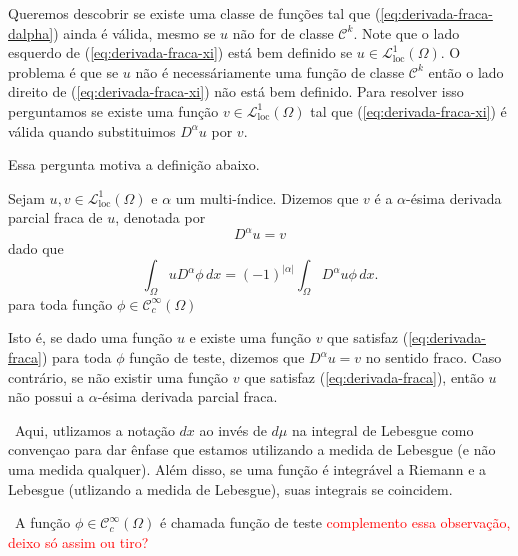 \documentclass[a4paper, 11pt]{book}
\theoremstyle{definition}
\newcommand{\obs}{\noindent{\textbf{\textcolor{black}{\sffamily Observação:}}}~}
\newcommand{\cC}{\mathcal{C}}
\newcommand{\cL}{\mathcal{L}}
\begin{document}
Queremos descobrir se existe uma classe de funções tal que (\ref{eq:derivada-fraca-dalpha}) ainda é válida, mesmo se $u$ não for de classe $\cC ^k$. Note que o lado esquerdo de (\ref{eq:derivada-fraca-xi}) está bem definido se $u \in \cL^1_{\mathrm{loc}}(\Omega)$.
O problema é que se $u$ não é necessáriamente uma função de classe $\cC^k$ então o lado direito de (\ref{eq:derivada-fraca-xi}) não está bem definido. Para resolver isso perguntamos se existe uma função $v \in \cL^1_{\mathrm{loc}}(\Omega)$ tal que (\ref{eq:derivada-fraca-xi}) é válida quando substituimos $D^\alpha u$ por $v$.

Essa pergunta motiva a definição abaixo.

\begin{dbox}
    Sejam $u,v \in \cL^1_{\mathrm{loc}}(\Omega)$ e $\alpha$ um multi-índice. Dizemos que $v$ é a $\alpha$-ésima derivada parcial fraca de $u$, denotada por
    \[
        D^\alpha u = v
    \]
    dado que
    \begin{equation} \label{eq:derivada-fraca}
        \int_\Omega u D^\alpha \phi \,dx = (-1)^{|\alpha|} \int_\Omega D^\alpha u \phi \,dx.
    \end{equation}
    para toda função $\phi \in \cC ^\infty_c(\Omega)$
\end{dbox}

Isto é, se dado uma função $u$ e existe uma função $v$ que satisfaz (\ref{eq:derivada-fraca}) para toda $\phi$ função de teste, dizemos que $D^\alpha u = v$ no sentido fraco.
Caso contrário, se não existir uma função $v$ que satisfaz (\ref{eq:derivada-fraca}), então $u$ não possui a $\alpha$-ésima derivada parcial fraca.

\obs Aqui, utlizamos a notação $dx$ ao invés de $d\mu$ na integral de Lebesgue como convençao para dar ênfase que estamos utilizando a medida de Lebesgue (e não uma medida qualquer).
Além disso, se uma função é integrável a Riemann e a Lebesgue (utlizando a medida de Lebesgue), suas integrais se coincidem.

\obs A função $\phi \in \cC^\infty_c(\Omega)$ é chamada função de teste \textcolor{red}{complemento essa observação, deixo só assim ou tiro?}
\end{document}
